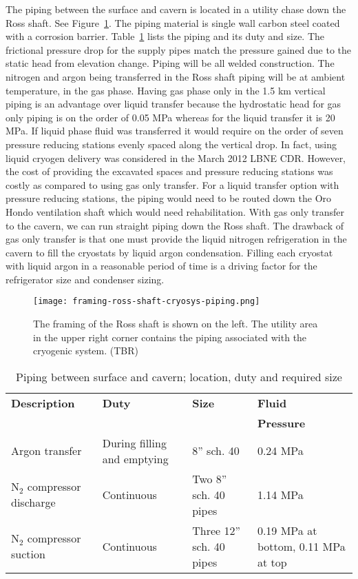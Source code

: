 The piping between the surface and cavern is located in a utility 
chase down the Ross shaft. See Figure~\ref{fig:framing-at-ross-piping}. 
The piping material is single wall carbon steel coated with a corrosion 
barrier. Table~\ref{table:pipelines} lists the piping and its duty 
and size. The frictional pressure drop for the supply pipes match
the pressure gained due to the static head from elevation change. 
Piping will be all welded construction. The nitrogen and argon 
being transferred in the Ross shaft piping will be at ambient 
temperature, in the gas phase. Having gas phase only in the 
1.5 km vertical piping is an advantage over liquid transfer 
because the hydrostatic head for gas only piping is on the order of
0.05 MPa whereas for the liquid transfer it is 20 MPa. If 
liquid phase fluid was transferred it would require on the order of
seven pressure reducing stations evenly spaced along the vertical drop.
In fact, using liquid cryogen delivery was considered in the March 
2012 LBNE CDR. However, the cost of providing 
the excavated spaces and pressure reducing stations was costly 
as compared to using gas only transfer. For a liquid transfer
option with pressure reducing stations, the piping would need 
to be routed down the Oro Hondo ventilation shaft which would 
need rehabilitation. With gas 
only transfer to the cavern, we can run straight piping down 
the Ross shaft. The drawback of gas only transfer is that one 
must provide the liquid nitrogen refrigeration in the cavern 
to fill the cryostats by liquid argon condensation. Filling 
each cryostat with liquid argon in a reasonable period of 
time is a driving factor for the refrigerator size and condenser sizing.

\begin{figure}[htbp]
\centering
\texttt{[image: framing-ross-shaft-cryosys-piping.png]} 
\caption{ The framing of the Ross shaft is shown on the left. The utility area in the upper
right corner contains the piping
associated with the cryogenic system. (TBR)}
\label{fig:framing-at-ross-piping}
\end{figure}

\begin{table}
\caption{Piping between surface and cavern; location, duty and required size}
\label{table:pipelines}
\begin{tabular}[htbp]{|p{}|p{}|p{}|p{}|}
\hline
{\bf Description} & {\bf Duty} & {\bf Size} & {\bf Fluid} \\
                  &            &            & {\bf Pressure} \\
\hline\hline
Argon transfer & During filling and emptying & 8'' sch. 40 &  0.24 MPa\\
\hline
N$_2$ compressor discharge & Continuous & Two 8'' sch. 40 pipes & 1.14 MPa \\
\hline
N$_2$ compressor suction & Continuous & Three 12'' sch. 40 pipes &  0.19 MPa at bottom, 0.11 MPa at top \\
\hline\end{tabular} 
\end{table}

